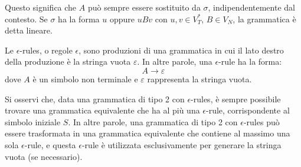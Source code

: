 \documentclass{article}
\begin{document}
Questo significa che \( A \) può sempre essere sostituito da \( \sigma \), indipendentemente dal contesto. Se \( \sigma \) ha la forma \( u \) oppure \( uBv \) con \( u, v \in V_T^* \), \( B \in V_N \), la grammatica è detta lineare.
\\\noindent   
\begin{definition}
Le \( \epsilon \)-rules, o regole \( \epsilon \), sono produzioni di una grammatica in cui il lato destro della produzione è la stringa vuota \( \varepsilon \). In altre parole, una \( \epsilon \)-rule ha la forma:
\[
A \rightarrow \varepsilon
\]
dove \( A \) è un simbolo non terminale e \( \varepsilon \) rappresenta la stringa vuota.
\end{definition}
\noindent Si osservi che, data una grammatica di tipo 2 con \( \epsilon \)-rules, è sempre possibile trovare una grammatica equivalente che ha al più una \( \epsilon \)-rule, corrispondente al simbolo iniziale \( S \). In altre parole, una grammatica di tipo 2 con \( \epsilon \)-rules può essere trasformata in una grammatica equivalente che contiene al massimo una sola \( \epsilon \)-rule, e questa \( \epsilon \)-rule è utilizzata esclusivamente per generare la stringa vuota (se necessario).
\end{document}
